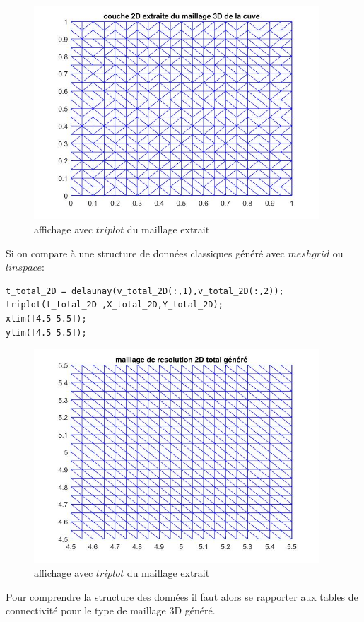 \documentclass[a4paper,12pt,titlepage]{report}
\begin{document}
\begin{onehalfspace}
\begin{figure}[!h]
	\center
	\includegraphics[height = 8cm, keepaspectratio]{graphes/affichage_extraction_2D.jpg}
	\caption{\label{figure 3 } affichage avec $triplot$ du maillage extrait}
\end{figure}
Si on compare à une structure de données classiques généré avec $meshgrid$ ou $linspace$:
\begin{verbatim}
t_total_2D = delaunay(v_total_2D(:,1),v_total_2D(:,2)); 
triplot(t_total_2D ,X_total_2D,Y_total_2D);
xlim([4.5 5.5]);
ylim([4.5 5.5]);
\end{verbatim} 
\begin{figure}[!h]
	\center
	\includegraphics[height = 8cm, keepaspectratio]{graphes/affichage_extraction_2D_normal.jpg}
	\caption{\label{figure 37 } affichage avec $triplot$ du maillage extrait}
\end{figure}
\newpage
Pour comprendre la structure des données il faut alors se rapporter  aux tables de connectivité pour le type de maillage 3D généré.
\begin{figure}[h]

\end{figure}
\end{onehalfspace}
\end{document}
